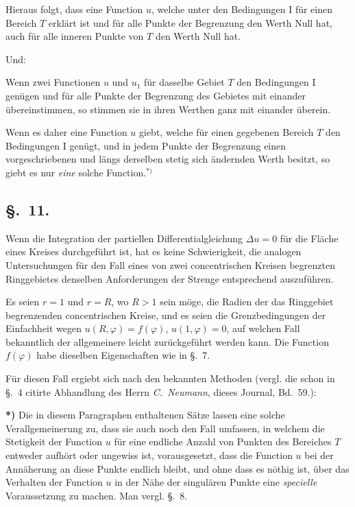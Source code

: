\documentclass{article}
\begin{document}
Hieraus folgt, dass eine Function $u$, welche unter den Bedingungen I für einen Bereich $T$ erklärt ist und für alle Punkte der Begrenzung den Werth Null hat, auch für alle inneren Punkte von $T$ den Werth Null hat.

Und:

Wenn zwei Functionen $u$ und $u_1$ für dasselbe Gebiet $T$ den Bedingungen I genügen und für alle Punkte der Begrenzung des Gebietes mit einander übereinstimmen, so stimmen sie in ihren Werthen ganz mit einander überein.

Wenn es daher eine Function $u$ giebt, welche für einen gegebenen Bereich $T$ den Bedingungen I genügt, und in jedem Punkte der Begrenzung einen vorgeschriebenen und längs derselben stetig sich ändernden Werth besitzt, so giebt es nur \emph{eine} solche Function.${}^{*)}$

\subsection*{§.~11.}

Wenn die Integration der partiellen Differentialgleichung $\Delta u = 0$ für die Fläche eines Kreises durchgeführt ist, hat es keine Schwierigkeit, die analogen Untersuchungen für den Fall eines von zwei concentrischen Kreisen begrenzten Ringgebietes denselben Anforderungen der Strenge entsprechend auszuführen.

Es seien $r = 1$ und $r = R$, wo $R > 1$ sein möge, die Radien der das Ringgebiet begrenzenden concentrischen Kreise, und es seien die Grenzbedingungen der Einfachheit wegen $u(R, \varphi) = f(\varphi)$, $u(1, \varphi) = 0$, auf welchen Fall bekanntlich der allgemeinere leicht zurückgeführt werden kann. Die Function $f(\varphi)$ habe dieselben Eigenschaften wie in §.~7.

Für diesen Fall ergiebt sich nach den bekannten Methoden (vergl. die schon in §.~4 citirte Abhandlung des Herrn \emph{C.~Neumann}, dieses Journal, Bd.~59.):

\textbf{*)} Die in diesem Paragraphen enthaltenen Sätze lassen eine solche Verallgemeinerung zu, dass sie auch noch den Fall umfassen, in welchem die Stetigkeit der Function $u$ für eine endliche Anzahl von Punkten des Bereiches $T$ entweder aufhört oder ungewiss ist, vorausgesetzt, dass die Function $u$ bei der Annäherung an diese Punkte endlich bleibt, und ohne dass es nöthig ist, über das Verhalten der Function $u$ in der Nähe der singulären Punkte eine \emph{specielle} Voraussetzung zu machen. Man vergl. §.~8.
\end{document}
